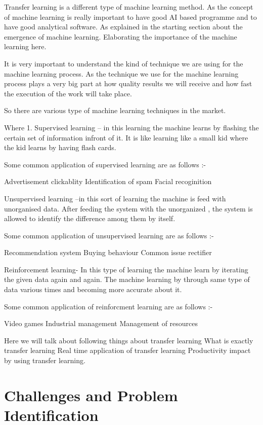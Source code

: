 Transfer learning is a different type of machine learning method.
As the concept of machine learning is really important to have good AI based programme
and to have good analytical software. As explained in the starting section about the
emergence of machine learning. Elaborating the importance of the machine learning here.

It is very important to understand the kind of technique we are using for the machine
learning process. As the technique we use for the machine learning process plays a very big
part at how quality results we will receive and how fast the execution of the work will take
place.

So there are various type of machine learning techniques in the market.

Where
1. Supervised learning – in this learning the machine learns by flashing the certain set
of information infront of it. It is like learning like a small kid where the kid learns by
having flash cards.

Some common application of supervised learning are as follows :-

Advertisement clickablity
Identification of spam
Facial recoginition




Unsupervised learning –in this sort of learning the machine is feed with unorganised
data. After feeding the system with the unorganized , the system is allowed to
identify the difference among them by itself.

Some common application of unsupervised learning are as follows :-

  Recommendation system
  Buying behaviour
  Common issue rectifier

Reinforcement learning- In this type of learning the machine learn by iterating the
given data again and again. The machine learning by through same type of data
various times and becoming more accurate about it.

Some common application of reinforcment learning are as follows :-

  Video games
  Industrial management
  Management of resources


Here we will talk about following things about transfer learning
	What is exactly transfer learning
	Real time application of transfer learning
	Productivity impact by using transfer learning.

\section{Challenges and Problem Identification}


